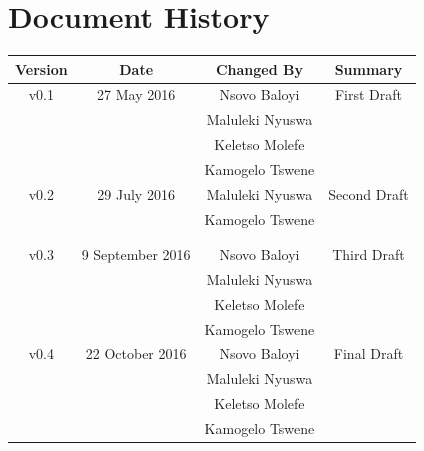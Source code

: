 \documentclass[a4paper,12pt]{article}
\begin{document}
	\newpage
	
	\tableofcontents
	\newpage
	\section*{Document History}
	
	\begin{table}[h!]
		
		\centering %
		\begin{tabular}{c c c c} %
			\hline\hline %
			Version & Date & Changed By & Summary \\ [0.5ex] %
			\hline %
			v0.1 & 27 May 2016 	& Nsovo Baloyi 		& First Draft 
			\\ & 				& Maluleki Nyuswa 	&  
			\\ & 				& Keletso Molefe 	&
			\\ & 				& Kamogelo Tswene 	& \\ [1ex] 
			\hline
			v0.2 & 29 July 2016 & Maluleki Nyuswa	& Second Draft
			\\ & 				& Kamogelo Tswene 	  
			\\ & 				& 	&
			\\ & 				&  	& \\ [1ex] 
			\hline %
			v0.3 & 9 September 2016 	& Nsovo Baloyi 		& Third Draft 
			\\ & 				& Maluleki Nyuswa 	&  
			\\ & 				& Keletso Molefe 	&
			\\ & 				& Kamogelo Tswene 	& \\ [1ex] 
			\hline %
			v0.4 & 22 October 2016 	& Nsovo Baloyi 		& Final Draft 
			\\ & 				& Maluleki Nyuswa 	&  
			\\ & 				& Keletso Molefe 	&
			\\ & 				& Kamogelo Tswene 	& \\ [1ex] 
			\hline\hline
		\end{tabular}
		\label{table:nonlin} %
	\end{table}
\end{document}
